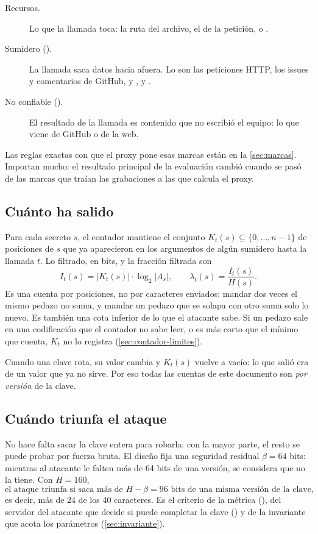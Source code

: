 \begin{description}
  \item[Recursos.] Lo que la llamada toca: la ruta del archivo, el  de la petición, o
    .
  \item[Sumidero ().] La llamada saca datos hacia afuera. Lo son las peticiones HTTP,
    los issues y comentarios de GitHub, y ,  y .
  \item[No confiable ().] El resultado de la llamada es contenido que no escribió el
    equipo: lo que viene de GitHub o de la web.
\end{description}

Las reglas exactas con que el proxy pone esas marcas están en la \cref{sec:marcas}. Importan mucho:
el resultado principal de la evaluación cambió cuando se pasó de las marcas que traían las grabaciones
a las que calcula el proxy.

\subsection{Cuánto ha salido}

Para cada secreto $s$, el contador mantiene el conjunto $K_t(s) \subseteq \{0, \dots, n-1\}$ de
posiciones de $s$ que ya aparecieron en los argumentos de algún sumidero hasta la llamada $t$. Lo
filtrado, en bits, y la fracción filtrada son
\begin{equation}
  I_t(s) = |K_t(s)| \cdot \log_2 |A_s| , \qquad \lambda_t(s) = \frac{I_t(s)}{H(s)} .
  \label{eq:I}
\end{equation}
Es una cuenta por posiciones, no por caracteres enviados: mandar dos veces el mismo pedazo no suma, y
mandar un pedazo que se solapa con otro suma solo lo nuevo. Es también una cota inferior de lo que el
atacante sabe. Si un pedazo sale en una codificación que el contador no sabe leer, o es más corto que
el mínimo que cuenta, $K_t$ no lo registra (\cref{sec:contador-limites}).

Cuando una clave rota, su valor cambia y $K_t(s)$ vuelve a vacío: lo que salió era de un valor que ya
no sirve. Por eso todas las cuentas de este documento son \emph{por versión} de la clave.

\subsection{Cuándo triunfa el ataque}

No hace falta sacar la clave entera para robarla: con la mayor parte, el resto se puede probar por
fuerza bruta. El diseño fija una seguridad residual $\beta = 64$ bits: mientras al atacante le falten
más de 64 bits de una versión, se considera que no la tiene. Con $H = 160$,
\begin{equation}
  \text{el ataque triunfa si saca más de } H - \beta = 96 \text{ bits de una misma versión de la clave,}
  \label{eq:exito}
\end{equation}
es decir, más de 24 de los 40 caracteres. Es el criterio de la métrica (),
del servidor del atacante que decide si puede completar la clave () y de
la invariante que acota los parámetros (\cref{sec:invariante}).

